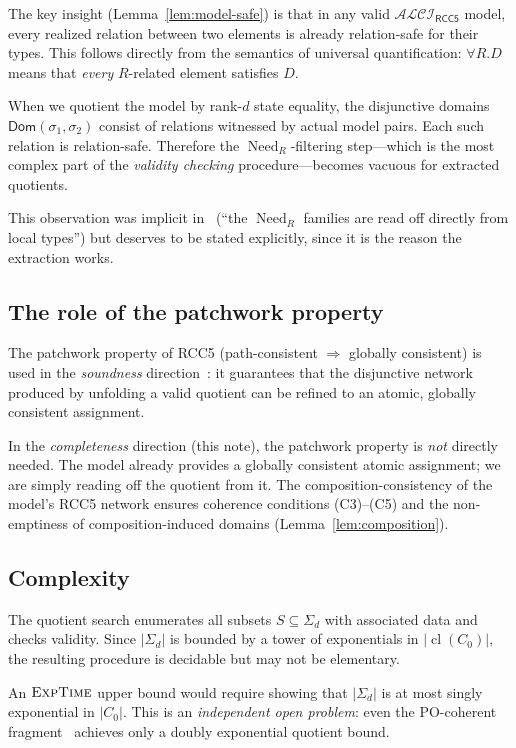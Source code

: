 \documentclass[11pt]{article}
\theoremstyle{definition}
\theoremstyle{remark}
\newcommand{\cl}{\operatorname{cl}}
\newcommand{\Need}{\operatorname{Need}}
\newcommand{\Dom}{\mathsf{Dom}}
\newcommand{\ALCIRCC}[1]{\mathcal{ALCI}_{\mathsf{RCC#1}}}
\begin{document}
The key insight (Lemma~\ref{lem:model-safe}) is that in any valid
$\ALCIRCC{5}$ model, every realized relation between two elements is
already relation-safe for their types.  This follows directly from
the semantics of universal quantification: $\forall R.D$ means that
\emph{every} $R$-related element satisfies $D$.

When we quotient the model by rank-$d$ state equality, the
disjunctive domains $\Dom(\sigma_1,\sigma_2)$ consist of relations
witnessed by actual model pairs.  Each such relation is
relation-safe.  Therefore the $\Need_R$-filtering step---which is
the most complex part of the \emph{validity checking}
procedure---becomes vacuous for extracted quotients.

This observation was implicit in~\cite{SplitForest} (``the $\Need_R$
families are read off directly from local types'') but deserves to
be stated explicitly, since it is the reason the extraction works.

\subsection{The role of the patchwork property}

The patchwork property of RCC5 (path-consistent $\Rightarrow$
globally consistent) is used in the \emph{soundness}
direction~\cite{SplitForest}: it guarantees that the disjunctive
network produced by unfolding a valid quotient can be refined to an
atomic, globally consistent assignment.

In the \emph{completeness} direction (this note), the patchwork
property is \emph{not} directly needed.  The model already provides
a globally consistent atomic assignment; we are simply reading off
the quotient from it.  The composition-consistency of the model's
RCC5 network ensures coherence conditions (C3)--(C5) and the
non-emptiness of composition-induced domains
(Lemma~\ref{lem:composition}).

\subsection{Complexity}

The quotient search enumerates all subsets $S\subseteq\Sigma_d$
with associated data and checks validity.  Since $|\Sigma_d|$ is
bounded by a tower of exponentials in $|\cl(C_0)|$, the resulting
procedure is decidable but may not be elementary.

An $\textsc{ExpTime}$ upper bound would require showing that
$|\Sigma_d|$ is at most singly exponential in $|C_0|$.  This is an
\emph{independent open problem}: even the PO-coherent
fragment~\cite{TwoTier} achieves only a doubly exponential quotient
bound.
\end{document}
